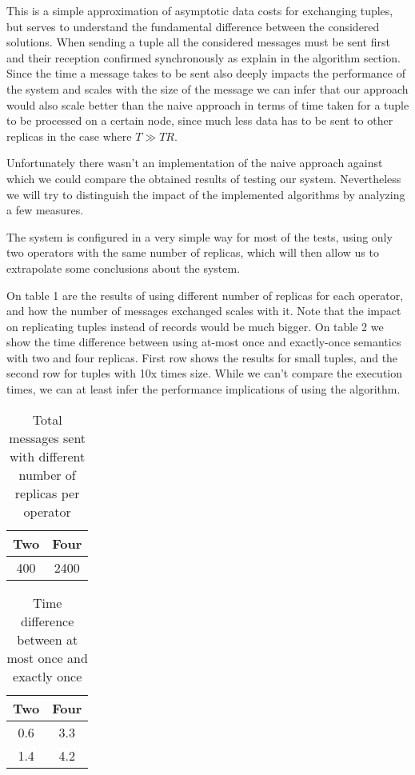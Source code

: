 \documentclass[times, 10pt,twocolumn]{article}
\begin{document}
This is a simple approximation of asymptotic data costs for exchanging tuples, but serves to understand the fundamental difference between the considered solutions. When sending a tuple all the considered messages must be sent first and their reception confirmed synchronously as explain in the algorithm section. Since the time a message takes to be sent also deeply impacts the performance of the system and scales with the size of the message we can infer that our approach would also scale better than the naive approach in terms of time taken for a tuple to be processed on a certain node, since much less data has to be sent to other replicas in the case where $T \gg TR$.

Unfortunately there wasn't an implementation of the naive approach against which we could compare the obtained results of testing our system. Nevertheless we will try to distinguish the impact of the implemented algorithms by analyzing a few measures. 

The system is configured in a very simple way for most of the tests, using only two operators with the same number of replicas, which will then allow us to extrapolate some conclusions about the system. 

On table 1 are the results of using different number of replicas for each operator, and how the number of messages exchanged scales with it. Note that the impact on replicating tuples instead of records would be much bigger. On table 2 we show the time difference between using at-most once and exactly-once semantics with two and four replicas. First row shows the results for small tuples, and the second row for tuples with 10x times size. While we can't compare the execution times, we can at least infer the performance implications of using the algorithm.

\begin{table}[!t]
\renewcommand{\arraystretch}{1.3}
\caption{Total messages sent with different number of replicas per operator}
\label{table_one}
\centering
\begin{tabular}{c||c}
\hline
\bfseries Two & \bfseries Four\\
\hline\hline
400 & 2400\\
\hline
\end{tabular}
\end{table}

\begin{table}[!t]
\renewcommand{\arraystretch}{1.3}
\caption{Time difference between at most once and exactly once}
\label{table_one}
\centering
\begin{tabular}{c||c}
\hline
\bfseries Two & \bfseries Four\\
\hline\hline
0.6 & 3.3\\
1.4 & 4.2\\
\hline
\end{tabular}
\end{table}
\end{document}
